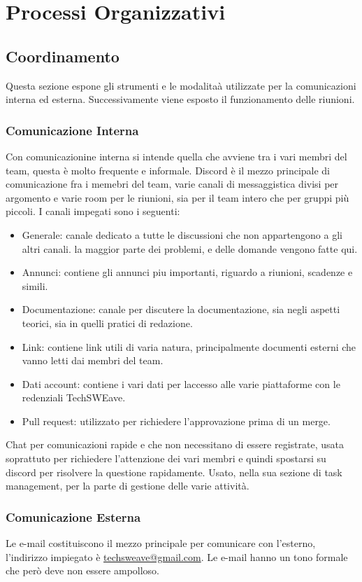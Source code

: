 \section{Processi Organizzativi}
\subsection{Coordinamento}
Questa sezione espone gli strumenti e le modalita\`a utilizzate per la comunicazioni interna ed esterna. Successivamente viene esposto il funzionamento delle riunioni.
\subsubsection{Comunicazione Interna}
Con comunicazionine interna si intende quella che avviene tra i vari membri del team, questa \`e molto frequente e informale.
Discord \`e il mezzo principale di comunicazione fra i memebri del team, varie canali di messaggistica divisi per argomento e varie room per le riunioni, sia per il team intero che per gruppi pi\`u piccoli.
I canali impegati sono i seguenti:
\begin{itemize}
    \item Generale: canale dedicato a tutte le discussioni che non appartengono a gli altri canali. la maggior parte dei problemi, e delle domande vengono fatte qui.
    \item Annunci: contiene gli annunci piu importanti, riguardo a riunioni, scadenze e simili.
    \item Documentazione: canale per discutere la documentazione, sia negli aspetti teorici, sia in quelli pratici di redazione.
    \item Link: contiene link utili di varia natura, principalmente documenti esterni che vanno letti dai membri del team.
    \item Dati account: contiene i vari dati per laccesso alle varie piattaforme con le redenziali TechSWEave.
    \item Pull request: utilizzato per richiedere l'approvazione prima di un merge.
\end{itemize}
Chat per comunicazioni rapide e che non necessitano di essere registrate, usata soprattuto per richiedere l'attenzione dei vari membri e quindi spostarsi su discord per risolvere la questione rapidamente.
Usato, nella sua sezione di task management, per la parte di gestione delle varie attivit\`a.
\subsubsection{Comunicazione Esterna}
Le e-mail costituiscono il mezzo principale per comunicare con l'esterno, l'indirizzo impiegato \`e \href{mailto:techsweave@gmail.com}{techsweave@gmail.com}. Le e-mail hanno un tono formale che per\`o deve non essere ampolloso.

